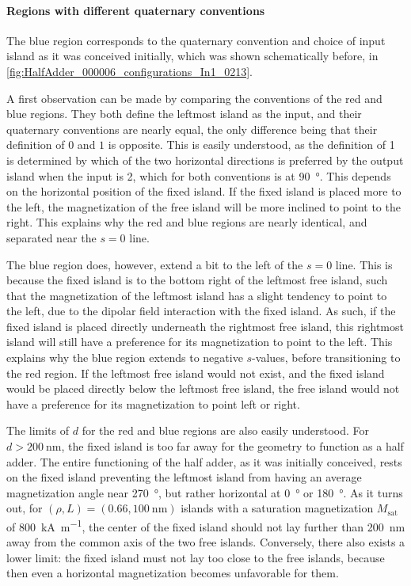 \documentclass[11pt,a4paper,english]{article}
\begin{document}
\paragraph{Regions with different quaternary conventions}
The blue region corresponds to the quaternary convention and choice of input island as it was conceived initially, which was shown schematically before, in \cref{fig:HalfAdder_000006_configurations_In1_0213}. \par
A first observation can be made by comparing the conventions of the red and blue regions. They both define the leftmost island as the input, and their quaternary conventions are nearly equal, the only difference being that their definition of $0$ and $1$ is opposite. This is easily understood, as the definition of 1 is determined by which of the two horizontal directions is preferred by the output island when the input is 2, which for both conventions is at \SI{90}{\degree}. This depends on the horizontal position of the fixed island. If the fixed island is placed more to the left, the magnetization of the free island will be more inclined to point to the right. This explains why the red and blue regions are nearly identical, and separated near the $s=0$ line. \par
The blue region does, however, extend a bit to the left of the $s=0$ line. This is because the fixed island is to the bottom right of the leftmost free island, such that the magnetization of the leftmost island has a slight tendency to point to the left, due to the dipolar field interaction with the fixed island. As such, if the fixed island is placed directly underneath the rightmost free island, this rightmost island will still have a preference for its magnetization to point to the left. This explains why the blue region extends to negative $s$-values, before transitioning to the red region. If the leftmost free island would not exist, and the fixed island would be placed directly below the leftmost free island, the free island would not have a preference for its magnetization to point left or right. \par
The limits of $d$ for the red and blue regions are also easily understood. For $d>\SI{200}{\nano\metre}$, the fixed island is too far away for the geometry to function as a half adder. The entire functioning of the half adder, as it was initially conceived, rests on the fixed island preventing the leftmost island from having an average magnetization angle near \SI{270}{\degree}, but rather horizontal at \SI{0}{\degree} or \SI{180}{\degree}. As it turns out, for $(\rho, L) = (0.66,\SI{100}{\nano\metre})$ islands with a saturation magnetization $M_\mathrm{sat}$ of \SI{800}{\kilo\ampere\per\metre}, the center of the fixed island should not lay further than \SI{200}{\nano\metre} away from the common axis of the two free islands. Conversely, there also exists a lower limit: the fixed island must not lay too close to the free islands, because then even a horizontal magnetization becomes unfavorable for them. \par
\end{document}
